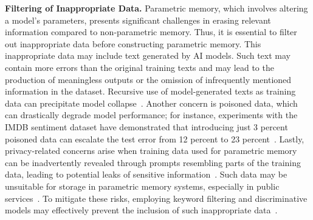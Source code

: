 \documentclass[journal,hideappendix]{vgtc}
\newenvironment{j_itemize}{
\begin{itemize}[]
  \setlength{\itemsep}{3pt}
  \setlength{\parskip}{0pt}
  \setlength{\parsep}{0pt}
}{\end{itemize}}
\begin{document}
\begin{j_itemize}

    \item[$\bullet$] \textbf{Filtering of Inappropriate Data.} Parametric memory, which involves altering a model's parameters, presents significant challenges in erasing relevant information compared to non-parametric memory. Thus, it is essential to filter out inappropriate data before constructing parametric memory. This inappropriate data may include text generated by AI models. Such text may contain more errors than the original training texts and may lead to the production of meaningless outputs or the omission of infrequently mentioned information in the dataset. Recursive use of model-generated texts as training data can precipitate model collapse~\cite{gibney2024ai,shumailov2024ai}. 
    Another concern is poisoned data, which can drastically degrade model performance; for instance, experiments with the IMDB sentiment dataset have demonstrated that introducing just 3 percent poisoned data can escalate the test error from 12 percent to 23 percent~\cite{steinhardt2017certified,cina2023wild}. Lastly, privacy-related concerns arise when training data used for parametric memory can be inadvertently revealed through prompts resembling parts of the training data, leading to potential leaks of sensitive information~\cite{schwarzschild2024rethinking}. Such data may be unsuitable for storage in parametric memory systems, especially in public services~\cite{krishnamurthy2011privacy,pan2020privacy,brown2022does}. To mitigate these risks, employing keyword filtering and discriminative models may effectively prevent the inclusion of such inappropriate data~\cite{androutsopoulos2000experimental,joung2021automated}.


\end{j_itemize}
\end{document}
